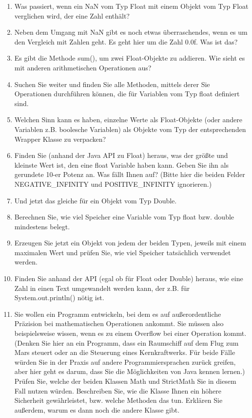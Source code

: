 \begin{enumerate}

	\item Was passiert, wenn ein NaN vom Typ Float mit einem Objekt vom Typ Float verglichen wird, der eine Zahl enthält?

	\item Neben dem Umgang mit NaN gibt es noch etwas überraschendes, wenn es um den Vergleich mit Zahlen geht. Es geht hier um die Zahl 0.0f. Was ist das?
	
	\item Es gibt die Methode sum(), um zwei Float-Objekte zu addieren. Wie sieht es mit anderen arithmetischen Operationen aus?
	
	\item Suchen Sie weiter und finden Sie alle Methoden, mittels derer Sie Operationen durchführen können, die für Variablen vom Typ float definiert sind.
	
	\item Welchen Sinn kann es haben, einzelne Werte als Float-Objekte (oder andere Variablen z.B. boolesche Variablen) als Objekte vom Typ der entsprechenden Wrapper Klasse zu verpacken?
	
	\item Finden Sie (anhand der Java API zu Float) heraus, was der größte und kleinste Wert ist, den eine float Variable haben kann. Geben Sie ihn als gerundete 10-er Potenz an. Was fällt Ihnen auf? (Bitte hier die beiden Felder NEGATIVE\_INFINITY und POSITIVE\_INFINITY ignorieren.)
	
	\item Und jetzt das gleiche für ein Objekt vom Typ Double.
	
	\item Berechnen Sie, wie viel Speicher eine Variable vom Typ float bzw. double mindestens belegt.
	
	\item Erzeugen Sie jetzt ein Objekt von jedem der beiden Typen, jeweils mit einem maximalen Wert und prüfen Sie, wie viel Speicher tatsächlich verwendet werden.
	
	\item Finden Sie anhand der API (egal ob für Float oder Double) heraus, wie eine Zahl in einen Text umgewandelt werden kann, der z.B. für System.out.println() nötig ist.
	
	\item Sie wollen ein Programm entwickeln, bei dem es auf außerordentliche Präzision bei mathematischen Operationen ankommt. Sie müssen also beispielsweise wissen, wenn es zu einem Overflow bei einer Operation kommt. (Denken Sie hier an ein Programm, dass ein Raumschiff auf dem Flug zum Mars steuert oder an die Steuerung eines Kernkraftwerks. Für beide Fälle würden Sie in der Praxis auf andere Programmiersprachen zurück greifen, aber hier geht es darum, dass Sie die Möglichkeiten von Java kennen lernen.) Prüfen Sie, welche der beiden Klassen Math und StrictMath Sie in diesem Fall nutzen würden. Beschreiben Sie, wie die Klasse Ihnen ein höhere Sicherheit gewährleistet, bzw. welche Methoden das tun. Erklären Sie außerdem, warum es dann noch die andere Klasse gibt.
	

\end{enumerate}
